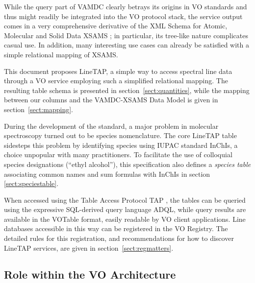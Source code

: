 \documentclass[11pt,a4paper]{ivoa}
\begin{document}
While the query part of VAMDC clearly betrays its origins in VO
standards and thus might readily be integrated into the VO protocol
stack, the service output comes in a very comprehensive derivative of
the XML Schema for Atomic, Molecular and Solid Data XSAMS
\citep{XSAMS:Docs}; in particular, its tree-like nature complicates
casual use.  In addition, many interesting use cases can already be
satisfied with a simple relational mapping of XSAMS.

This document proposes LineTAP, a simple way to access spectral line
data through a VO service employing such a simplified relational
mapping.  The resulting table schema is presented in
section~\ref{sect:quantities}, while the mapping between our columns and the
VAMDC-XSAMS Data Model is given in section~\ref{sect:mapping}.

During the development of the standard, a major problem in molecular
spectroscopy turned out to be species nomenclature.  The core LineTAP
table sidesteps this problem by identifying species using IUPAC standard
InChIs, a choice unpopular with many practitioners.  To facilitate the
use of colloquial species designations (``ethyl alcohol''), this
specification also defines a \textit{species table} associating common
names and sum formulas with InChIs in section \ref{sect:speciestable}.

When accessed using the Table Access Protocol TAP
\citep{2019ivoa.spec.0927D}, the tables can be queried using the
expressive SQL-derived query language ADQL, while query results are
available in the VOTable format, easily readable by VO client
applications.  Line databases accessible in this way can be registered
in the VO Registry.  The detailed rules for this registration, and
recommendations for how to discover LineTAP services, are given in
section~\ref{sect:regmatters}.

\subsection{Role within the VO Architecture}
\end{document}
